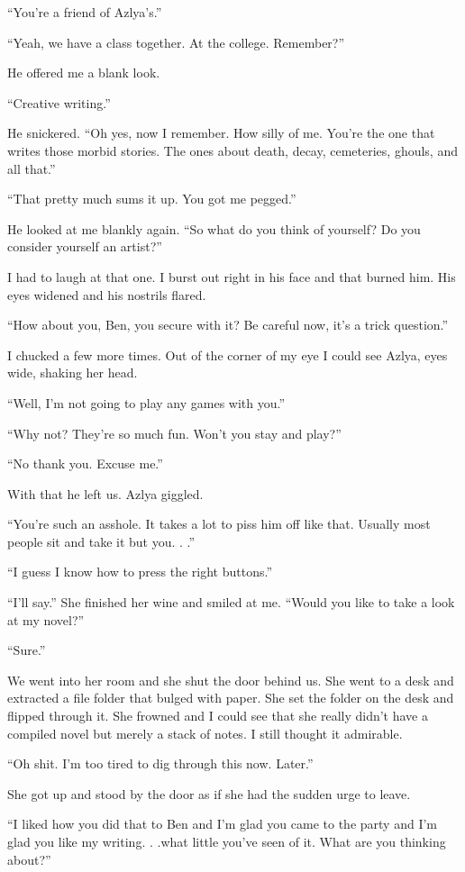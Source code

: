 ``You're a friend of Azlya's.''

``Yeah, we have a class together. At the college. Remember?''

He offered me a blank look.

``Creative writing.''

He snickered. ``Oh yes, now I remember. How silly of me. You're the one
that writes those morbid stories. The ones about death, decay,
cemeteries, ghouls, and all that.''

``That pretty much sums it up. You got me pegged.''

He looked at me blankly again. ``So what do you think of yourself? Do
you consider yourself an artist?''

I had to laugh at that one. I burst out right in his face and that
burned him. His eyes widened and his nostrils flared.

``How about you, Ben, you secure with it? Be careful now, it's a trick
question.''

I chucked a few more times. Out of the corner of my eye I could see
Azlya, eyes wide, shaking her head.

``Well, I'm not going to play any games with you.''

``Why not? They're so much fun. Won't you stay and play?''

``No thank you. Excuse me.''

With that he left us. Azlya giggled.

``You're such an asshole. It takes a lot to piss him off like that.
Usually most people sit and take it but you. . .''

``I guess I know how to press the right buttons.''

``I'll say.'' She finished her wine and smiled at me. ``Would you like
to take a look at my novel?''

``Sure.''

We went into her room and she shut the door behind us. She went to a
desk and extracted a file folder that bulged with paper. She set the
folder on the desk and flipped through it. She frowned and I could see
that she really didn't have a compiled novel but merely a stack of
notes. I still thought it admirable.

``Oh shit. I'm too tired to dig through this now. Later.''

She got up and stood by the door as if she had the sudden urge to leave.

``I liked how you did that to Ben and I'm glad you came to the party and
I'm glad you like my writing. . .what little you've seen of it. What are
you thinking about?''

